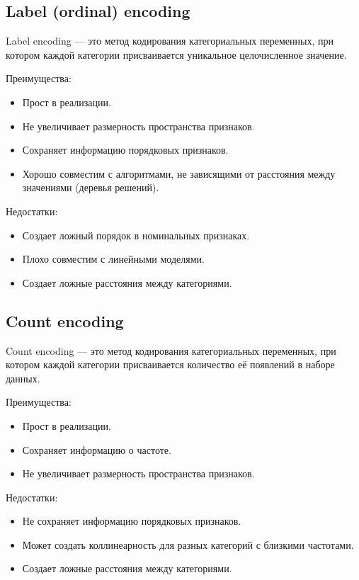 \subsection*{Label (ordinal) encoding}

Label encoding — это метод кодирования категориальных переменных, при котором каждой категории присваивается уникальное целочисленное значение.

Преимущества:
\begin{itemize}
	\item Прост в реализации.
	\item Не увеличивает размерность пространства признаков.
	\item Сохраняет информацию порядковых признаков.
	\item Хорошо совместим с алгоритмами, не зависящими от расстояния между значениями (деревья решений).
\end{itemize}

Недостатки:
\begin{itemize}
	\item Создает ложный порядок в номинальных признаках.
	\item Плохо совместим с линейными моделями.
	\item Создает ложные расстояния между категориями.
\end{itemize}

\subsection*{Count encoding}

Count encoding — это метод кодирования категориальных переменных, при котором каждой категории присваивается количество её появлений в наборе данных. 
	
Преимущества:
\begin{itemize}
	\item Прост в реализации.
	\item Сохраняет информацию о частоте.
	\item Не увеличивает размерность пространства признаков.
\end{itemize}

Недостатки:
\begin{itemize}
	\item Не сохраняет информацию порядковых признаков.
	\item Может создать коллинеарность для разных категорий с близкими частотами.
	\item Создает ложные расстояния между категориями.
\end{itemize}

